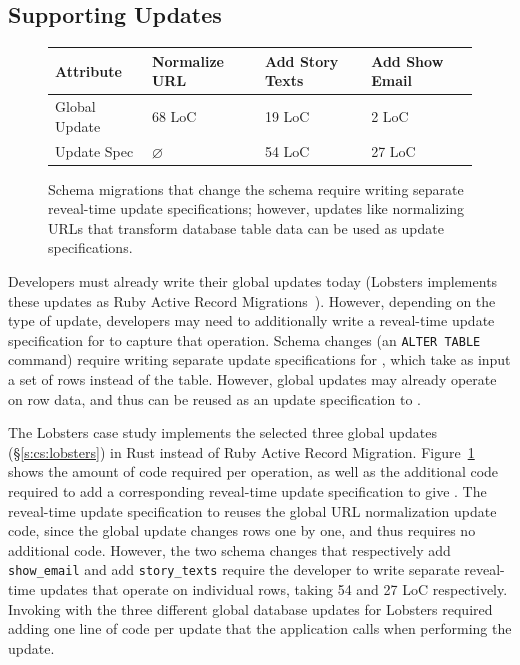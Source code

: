 \subsection{Supporting Updates}
\begin{figure}
    \centering
    \begin{tabular}{m{}|m{}|m{}|m{}}
        \centering\textbf{Attribute} & \textbf{Normalize URL} & \textbf{Add Story Texts} &
        \textbf{Add Show Email} \\
        \hline
        Global Update & 68 LoC & 19 LoC & 2 LoC \\
        \hline
        Update Spec & $\varnothing$ & 54 LoC & 27 LoC \\
    \end{tabular}
    \caption[Code required to write reveal-time update specifications.]{Schema
    migrations that change the schema require
    writing separate reveal-time update specifications; however, updates like
    normalizing URLs that transform database table data can be used as update
    specifications.}
    \label{tab:updates}
\end{figure}

Developers must already write their global updates today (\eg Lobsters
implements these updates as Ruby Active Record Migrations~\cite{ruby_arm}). 
%
However, depending on the type of update, developers may need to additionally
write a reveal-time update specification for \sys to capture that operation.
%
Schema changes (\eg an \texttt{ALTER TABLE} command) require writing separate
update specifications for \sys, which take as input a set of rows instead of the table.
%
However, global updates may already operate on row data, and thus
can be reused as an update specification to \sys.


%
The Lobsters case study implements the selected three global updates
(\S\ref{s:cs:lobsters})
in Rust instead of Ruby Active Record Migration. Figure~\ref{tab:updates} shows
the amount of code required per operation, as well as the additional code
required to add a corresponding reveal-time update specification to give \sys.
The reveal-time update specification to \sys reuses the global URL normalization
update code, since the global update changes rows one by one, and thus requires
no additional code.
%
However, the two schema changes that respectively add
\texttt{show\_email} and add \texttt{story\_texts} require the developer to
write separate reveal-time updates that operate on individual rows, taking 54
and 27 LoC respectively.
%
%
Invoking \sys with the three different global database updates for Lobsters
required adding one line of code per update that the application calls when
performing the update. 
%

